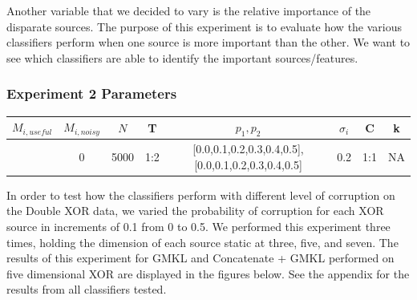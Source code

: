 \documentclass{article}
\begin{document}
Another variable that we decided to vary is the relative importance of the
disparate sources. The purpose of this experiment is to evaluate how the
various classifiers perform when one source is more important than the other.
We want to see which classifiers are able to identify the important
sources/features.

\subsubsection*{Experiment 2 Parameters}
\begin{center}
\begin{tabular}{|c|c|c|c|c|c|c|c|}
\hline
$M_{i,useful}$ & $M_{i, noisy}$ & $N$ & T &  $p_1, p_2$ & $\sigma_i$ & C &  k  \\
\hline
[3,5,7] & 0 & 5000 & 1:2 & [0.0,0.1,0.2,0.3,0.4,0.5],[0.0,0.1,0.2,0.3,0.4,0.5] & 0.2 & 1:1 & NA  \\
\hline
\end{tabular}
\end{center}



In order to test how the classifiers perform with different level of corruption
on the Double XOR data, we varied the probability of corruption for each XOR
source in increments of 0.1 from 0 to 0.5. We performed this experiment three
times, holding the dimension of each source static at three, five, and seven.
The results of this experiment for GMKL and Concatenate + GMKL performed on
five dimensional XOR are displayed in the figures below. See the appendix for
the results from all classifiers tested.
\end{document}
